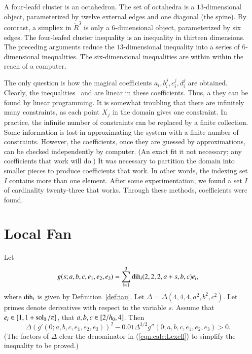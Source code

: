 A four-leafd cluster is an octahedron.  The set of octahedra is a
$13$-dimensional object, parameterized by twelve external edges and one
diagonal (the spine).  By contrast, a simpliex in $\ring{R}^3$ is only
a $6$-dimensional object, parameterized by six edges.  The four-leafed
cluster inequality is an inequality in thirteen dimensions.  The preceding
arguments reduce the $13$-dimensional inequality into a series of
$6$-dimensional inequalities.  The six-dimensional inequalities are
within within the reach of a computer.

The only question is how the magical coefficients
$a_i,b_i^j,c_i^j,d_i^j$ are obtained.  Clearly, the
inequalities~ and  are linear in these
coefficients.  Thus, a they can be found by linear programming.  It is
somewhat troubling that there are infinitely many constraints, as each
point $X_j$ in the domain gives one constraint.  In practice, the
infinite number of constraints can be replaced by a finite collection.
Some information is lost in approximating the system with a finite
number of constraints.  However, the coefficients, once they are
guessed by approximations, can be checked independently by computer.
(An exact fit it not necessary; any coefficients that work will do.)
It was necessary to partition the domain into smaller pieces to
produce coefficients that work.  In other words, the indexing set $I$
contains more than one element.  After some experimentation, we found
a set $I$ of cardinality twenty-three that works.  Through these methods,
coefficients were found.



\chapter{Local Fan}

\begin{calculation}\label{calc:Lexell}
Let
\begin{displaymath}
g(s;a,b,c,e_1,e_2,e_3) = \sum_{i=1}^3 \operatorname{dih}_i(2,2,2,a+s,b,c) e_i,
\end{displaymath}
where $\operatorname{dih}_i$ is given by Definition~\ref{def:tau}.
Let $\Delta = \Delta(4,4,4,a^2,b^2,c^2)$.
Let primes denote derivatives with respect to the variable $s$.
Assume that
$e_i\in[1,1+\operatorname{sol}_0/\pi]$,  that
$a,b,c\in[2/{h_0},4]$.
Then
\begin{equation}\label{eqn:calc:Lexell}
  \Delta (g'(0;a,b,c,e_1,e_2,e_3))^2 
- 0.01\Delta^{3/2}g''(0;a,b,c,e_1,e_2,e_3) > 0.
\end{equation}
(The factors of $\Delta$ clear the denominator in
(\ref{eqn:calc:Lexell}) to simplify the inequality to be proved.)
\end{calculation}

